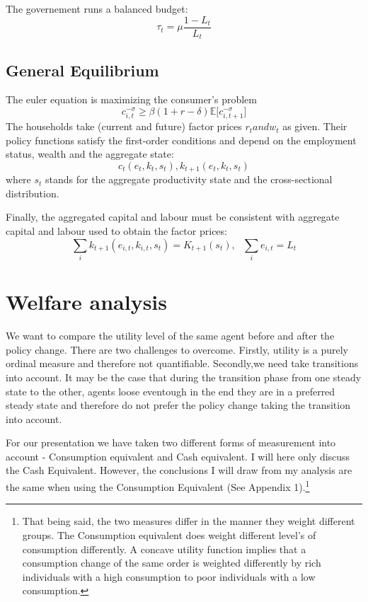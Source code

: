 \documentclass[a4paper,12pt]{article}
\begin{document}
The governement runs a balanced budget:
\[
\tau_{t}=\mu\frac{1-L_{t}}{L_{t}}
\]

\subsection{General Equilibrium}

The euler equation is maximizing the consumer's problem
\[ 
c_{i,t}^{- \sigma} \geq \beta (1+r -\delta){\mathbb{E}[c_{i,t+1}^{- \sigma}}]
\]
The households take (current and future) factor prices $r_{t} and w_{t}$ as given. Their policy functions satisfy the first-order conditions and depend on the employment status, wealth and the aggregate state: 
\[ c_{t}(e_{t},k_{t},s_{t}), k_{t+1}(e_{t},k_{t},s_{t})
\]
where $s_{t}$ stands for the aggregate productivity state and the cross-sectional distribution. 

Finally, the aggregated capital and labour must be consistent with aggregate capital and labour used to obtain the factor prices: 
\[ \sum_{i}k_{t+1}(e_{i,t},k_{i,t},s_{t})=K_{t+1}(s_{t}), \ \ \ \sum_{i}e_{i,t}=L_{t} 
\]

\section{Welfare analysis}
We want to compare the utility level of the same agent before and after the policy change. There are two challenges to overcome. Firstly, utility is a purely ordinal measure and therefore not quantifiable. Secondly,we need take transitions into account. It may be the case that during the transition phase from one steady state to the other, agents loose eventough in the end they are in a preferred steady state and therefore do not prefer the policy change taking the transition into account. 

For our presentation we have taken two different forms of measurement into account - Consumption equivalent and Cash equivalent. I will here only discuss the Cash Equivalent. However, the conclusions I will draw from my analysis are the same when using the Consumption Equivalent (See Appendix 1).\footnote{That being said, the two measures differ in the manner they weight different groups. The Consumption equivalent does weight different level's of consumption differently. A concave utility function implies that a consumption change of the same order is weighted differently by rich individuals with a high consumption to poor individuals with a low consumption.} 
\end{document}
